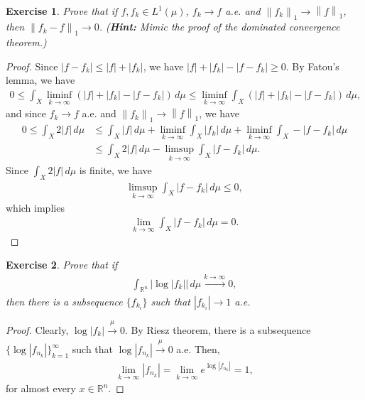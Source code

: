 \documentclass[11pt]{book}
\newtheorem{exercise}{Exercise}[section]
\theoremstyle{definition}
\numberwithin{equation}{chapter}
\begin{document}
\begin{exercise}
Prove that if  $f,f_k \in L^1(\mu)$, $f_k \to f$ a.e. and $\left\|f_k\right\|_1 \to \left\|f\right\|_1$, then $\left\|f_k - f\right\|_1 \to 0$. ({\bf Hint:} Mimic the proof of the dominated convergence theorem.)
\end{exercise}
\begin{proof}
Since $\left|f - f_k\right| \leq \left|f\right| + \left|f_k\right|$, we have $\left|f\right| + \left|f_k\right| - \left|f - f_k\right| \geq 0$. By Fatou's lemma, we have
\begin{align*}
    0 \leq \int_X \liminf_{k\to\infty} (\left|f\right| + \left|f_k\right| - \left|f - f_k\right|) \,d\mu \leq \liminf_{k\to\infty} \int_X (\left|f\right| + \left|f_k\right| - \left|f - f_k\right|) \,d\mu,
\end{align*}
and since $f_k \to f$ a.e. and $\left\|f_k\right\|_1 \to \left\|f\right\|_1$, we have
\begin{align*}
    0 \leq \int_X 2 \left|f\right| \,d\mu & \leq \int_X \left|f\right|\,d\mu + \liminf_{k\to\infty} \int_X \left|f_k\right|\,d\mu + \liminf_{k\to\infty} \int_X -\left|f - f_k\right|\,d\mu \\
    & \leq \int_X 2 \left|f\right|\,d\mu - \limsup_{k\to\infty} \int_X \left|f - f_k\right|\,d\mu.
\end{align*}
Since $\int_X 2 \left|f\right|\,d\mu$ is finite, we have
\begin{align*}
    \limsup_{k\to\infty} \int_X \left|f - f_k\right|\,d\mu \leq 0,
\end{align*}
which implies
\begin{align*}
    \lim_{k\to\infty} \int_X \left|f - f_k\right|\,d\mu = 0.
\end{align*}
\end{proof}

\medskip

\begin{exercise}
Prove that if
\begin{align*}
    \int_{\mathbb{R}^n} \left|\log \left|f_k\right|\right| \,d\mu \xrightarrow[]{k \to \infty} 0,
\end{align*}
then there is a subsequence $\{f_{k_i}\}$ such that $\left|f_{k_i}\right| \to 1$ a.e.
\end{exercise}
\begin{proof}
Clearly, $\log \left|f_k\right| \xrightarrow[]{\mu} 0$. By Riesz theorem, there is a subsequence $\{\log \left|f_{n_k}\right|\}^\infty_{k=1}$ such that $\log \left|f_{n_k}\right| \xrightarrow[]{\mu} 0$ a.e. Then,
\begin{align*}
    \lim_{k\to\infty} \left|f_{n_k}\right| = \lim_{k\to\infty} e^{\log \left|f_{n_k}\right|} = 1,
\end{align*}
for almost every $x \in \mathbb{R}^n$.
\end{proof}
\end{document}
